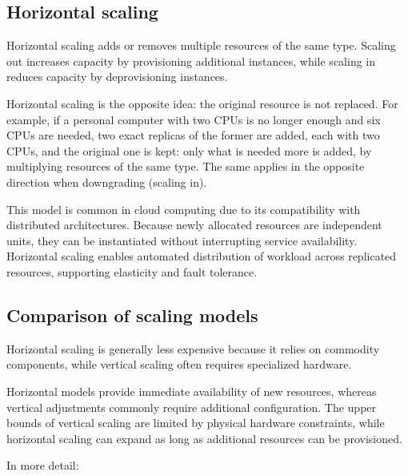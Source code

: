 \subsection{Horizontal scaling}

Horizontal scaling adds or removes multiple resources of the same type. Scaling out increases capacity by provisioning additional instances, while scaling in reduces capacity by deprovisioning instances.

Horizontal scaling is the opposite idea: the original resource is not replaced. For example, if a personal computer with two CPUs is no longer enough and six CPUs are needed, two exact replicas of the former are added, each with two CPUs, and the original one is kept: only what is needed more is added, by multiplying resources of the same type. The same applies in the opposite direction when downgrading (scaling in).

\begin{center}
\end{center}

This model is common in cloud computing due to its compatibility with distributed architectures. Because newly allocated resources are independent units, they can be instantiated without interrupting service availability. Horizontal scaling enables automated distribution of workload across replicated resources, supporting elasticity and fault tolerance.

\subsection{Comparison of scaling models}

Horizontal scaling is generally less expensive because it relies on commodity components, while vertical scaling often requires specialized hardware.

\begin{center}
\end{center}

 Horizontal models provide immediate availability of new resources, whereas vertical adjustments commonly require additional configuration. The upper bounds of vertical scaling are limited by physical hardware constraints, while horizontal scaling can expand as long as additional resources can be provisioned.
 
 In more detail:
 
